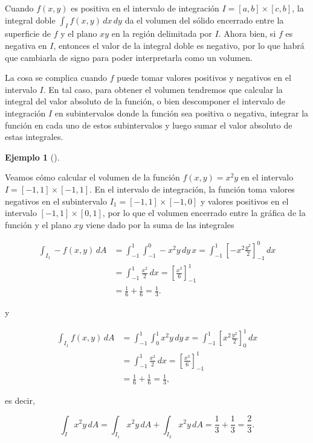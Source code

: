 \documentclass[
  a4paper,
]{scrreport}
\theoremstyle{plain}
\theoremstyle{definition}
\theoremstyle{plain}
\theoremstyle{plain}
\theoremstyle{definition}
\newtheorem{example}{Ejemplo}[chapter]
\theoremstyle{definition}
\theoremstyle{remark}
\begin{document}
Cuando \(f(x,y)\) es positiva en el intervalo de integración
\(I=[a,b]\times[c,b]\), la integral doble \(\int_I f(x,y)\,dx\,dy\) da
el volumen del sólido encerrado entre la superficie de \(f\) y el plano
\(xy\) en la región delimitada por \(I\). Ahora bien, si \(f\) es
negativa en \(I\), entonces el valor de la integral doble es negativo,
por lo que habrá que cambiarla de signo para poder interpretarla como un
volumen.

La cosa se complica cuando \(f\) puede tomar valores positivos y
negativos en el intervalo \(I\). En tal caso, para obtener el volumen
tendremos que calcular la integral del valor absoluto de la función, o
bien descomponer el intervalo de integración \(I\) en subintervalos
donde la función sea positiva o negativa, integrar la función en cada
uno de estos subintervalos y luego sumar el valor absoluto de estas
integrales.

\begin{example}[]\protect\hypertarget{exm-volumen-integral-doble}{}\label{exm-volumen-integral-doble}

Veamos cómo calcular el volumen de la función \(f(x,y)=x^2y\) en el
intervalo \(I=[-1,1]\times[-1,1]\). En el intervalo de integración, la
función toma valores negativos en el subintervalo
\(I_1=[-1,1]\times[-1,0]\) y valores positivos en el intervalo
\([-1,1]\times[0,1]\), por lo que el volumen encerrado entre la gráfica
de la función y el plano \(xy\) viene dado por la suma de las integrales

\begin{align*}
\int_{I_1} -f(x,y)\,dA 
&= \int_{-1}^1\int_{-1}^0 -x^2y\,dy\,x
= \int_{-1}^1 \left[-x^2\frac{y^2}{2}\right]_{-1}^0\,dx \\
&= \int_{-1}^1 \frac{x^2}{2}\,dx
= \left[\frac{x^3}{6}\right]_{-1}^1 \\
&= \frac{1}{6}+\frac{1}{6} 
= \frac{1}{3}.
\end{align*}

y

\begin{align*}
\int_{I_1} f(x,y)\,dA 
&= \int_{-1}^1\int_0^1 x^2y\,dy\,x
= \int_{-1}^1 \left[x^2\frac{y^2}{2}\right]_0^1\,dx \\
&= \int_{-1}^1 \frac{x^2}{2}\,dx
= \left[\frac{x^3}{6}\right]_{-1}^1 \\
&= \frac{1}{6}+\frac{1}{6} 
= \frac{1}{3},
\end{align*}

es decir,

\[
\int_I x^2y\,dA 
= \int_{I_1} x^2y\,dA + \int_{I_2} x^2y\,dA
= \frac{1}{3} + \frac{1}{3}
= \frac{2}{3}.
\]

\end{example}
\end{document}
